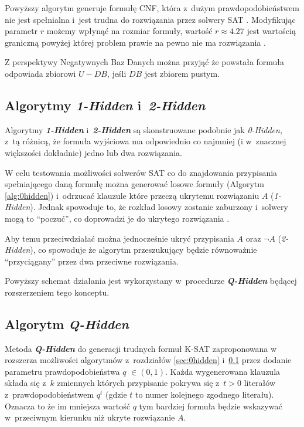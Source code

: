 Powyższy algorytm generuje formułę CNF, która z~dużym prawdopodobieństwem nie jest spełnialna i~jest trudna do rozwiązania przez solwery SAT \cite{GeneratingHardFormulasByHidingSolutionsDeceptively, HidingSatisfyingAssignmentsTwoAreBetterThanOne}.
Modyfikując parametr $r$ możemy wpłynąć na rozmiar formuły, wartość $r \approx 4.27$ jest wartością graniczną powyżej której problem prawie na pewno nie ma rozwiązania \cite{GeneratingHardFormulasByHidingSolutionsDeceptively}.

Z perspektywy Negatywnych Baz Danych można przyjąć że powstała formuła odpowiada zbiorowi $U - DB$, jeśli $DB$ jest zbiorem pustym.

\subsection{Algorytmy \textit{1-Hidden} i~\textit{2-Hidden}}
\label{sec:12hidden}
Algorytmy \textit{\textbf{1-Hidden}} i~\textit{\textbf{2-Hidden}} są skonstruowane podobnie jak \textit{0-Hidden}, z~tą różnicą, że formuła wyjściowa ma odpowiednio co najmniej (i w~znacznej większości dokładnie) jedno lub dwa rozwiązania.  
 
W celu testowania możliwości solwerów SAT co do znajdowania przypisania spełniającego daną formułę można generować losowe formuły (Algorytm \ref{alg:0hidden}) i~odrzucać klauzule które
przeczą ukrytemu rozwiązaniu $A$ (\textit{1-Hidden}). Jednak spowoduje to, że rozkład losowy zostanie zaburzony i~solwery mogą to \enquote{poczuć}, co doprowadzi je do ukrytego rozwiązania \cite{HidingSatisfyingAssignmentsTwoAreBetterThanOne}.
    
Aby temu przeciwdziałać można jednocześnie ukryć przypisania $A$ oraz $\neg A$ (\textit{2-Hidden}), co spowoduje że algorytm przeszukujący będzie równoważnie \enquote{przyciągany} przez dwa przeciwne rozwiązania.

Powyższy schemat działania jest wykorzystany w~procedurze \textit{\textbf{Q-Hidden}} będącej rozszerzeniem tego konceptu.


\subsection{Algorytm \textit{Q-Hidden}}
  Metoda \textit{\textbf{Q-Hidden}} do generacji trudnych formuł K-SAT zaproponowana w~\cite{GeneratingHardFormulasByHidingSolutionsDeceptively} rozszerza możliwości algorytmów z~rozdziałów \ref{sec:0hidden} i~\ref{sec:12hidden}
  przez dodanie parametru prawdopodobieństwa $q$ $\in (0, 1)$. Każda wygenerowana klauzula składa się z~$k$ zmiennych których przypisanie pokrywa się z~$t > 0$ literałów z~prawdopodobieństwem $q^t$ (gdzie $t$ to numer kolejnego zgodnego literału).
  Oznacza to że im mniejsza wartość $q$ tym bardziej formuła będzie wskazywać w~przeciwnym kierunku niż ukryte rozwiązanie $A$. 
  
